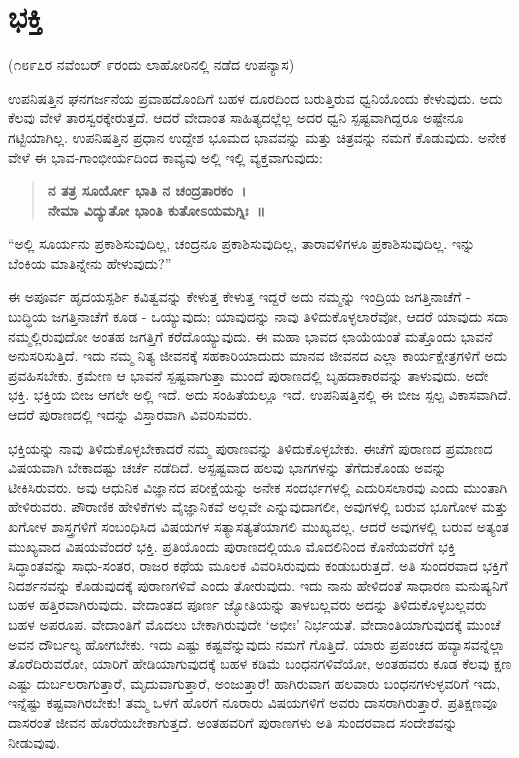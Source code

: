 
\chapter{ಭಕ್ತಿ}

\begin{center}
(೧೮೯೭ರ ನವೆಂಬರ್​ ೯ರಂದು ಲಾಹೋರಿನಲ್ಲಿ ನಡೆದ ಉಪನ್ಯಾಸ)
\end{center}

ಉಪನಿಷತ್ತಿನ ಘನಗರ್ಜನೆಯ ಪ್ರವಾಹದೊಂದಿಗೆ ಬಹಳ ದೂರದಿಂದ ಬರುತ್ತಿರುವ ಧ್ವನಿಯೊಂದು ಕೇಳುವುದು. ಅದು ಕೆಲವು ವೇಳೆ ತಾರಸ್ವರಕ್ಕೇರುತ್ತದೆ. ಆದರೆ ವೇದಾಂತ ಸಾಹಿತ್ಯದಲ್ಲೆಲ್ಲ ಅದರ ಧ್ವನಿ ಸ್ಪಷ್ಟವಾಗಿದ್ದರೂ ಅಷ್ಟೇನೂ ಗಟ್ಟಿಯಾಗಿಲ್ಲ. ಉಪನಿಷತ್ತಿನ ಪ್ರಧಾನ ಉದ್ದೇಶ ಭೂಮದ ಭಾವವನ್ನು ಮತ್ತು ಚಿತ್ರವನ್ನು ನಮಗೆ ಕೊಡುವುದು. ಅನೇಕ ವೇಳೆ ಈ ಭಾವ-ಗಾಂಭೀರ್ಯದಿಂದ ಕಾವ್ಯವು ಅಲ್ಲಿ ಇಲ್ಲಿ ವ್ಯಕ್ತವಾಗುವುದು:

\begin{verse}
\textbf{ನ ತತ್ರ ಸೂರ್ಯೋ ಭಾತಿ ನ ಚಂದ್ರತಾರಕಂ~।}\\\textbf{ನೇಮಾ ವಿದ್ಯುತೋ ಭಾಂತಿ ಕುತೋಽಯಮಗ್ನಿಃ~॥}
\end{verse}

“ಅಲ್ಲಿ ಸೂರ್ಯನು ಪ್ರಕಾಶಿಸುವುದಿಲ್ಲ, ಚಂದ್ರನೂ ಪ್ರಕಾಶಿಸುವುದಿಲ್ಲ, ತಾರಾವಳಿಗಳೂ ಪ್ರಕಾಶಿಸುವುದಿಲ್ಲ. ಇನ್ನು ಬೆಂಕಿಯ ಮಾತಿನ್ನೇನು ಹೇಳುವುದು?”

ಈ ಅಪೂರ್ವ ಹೃದಯಸ್ಪರ್ಶಿ ಕವಿತ್ವವನ್ನು ಕೇಳುತ್ತ ಕೇಳುತ್ತ ಇದ್ದರೆ ಅದು ನಮ್ಮನ್ನು ಇಂದ್ರಿಯ ಜಗತ್ತಿನಾಚೆಗೆ - ಬುದ್ಧಿಯ ಜಗತ್ತಿನಾಚೆಗೆ ಕೂಡ - ಒಯ್ಯುವುದು; ಯಾವುದನ್ನು ನಾವು ತಿಳಿದುಕೊಳ್ಳಲಾರೆವೋ, ಆದರೆ ಯಾವುದು ಸದಾ ನಮ್ಮಲ್ಲಿರುವುದೋ ಅಂತಹ ಜಗತ್ತಿಗೆ ಕರೆದೊಯ್ಯುವುದು. ಈ ಮಹಾ ಭಾವದ ಛಾಯೆಯಂತೆ ಮತ್ತೊಂದು ಭಾವನೆ ಅನುಸರಿಸುತ್ತಿದೆ. ಇದು ನಮ್ಮ ನಿತ್ಯ ಜೀವನಕ್ಕೆ ಸಹಕಾರಿಯಾದುದು ಮಾನವ ಜೀವನದ ಎಲ್ಲಾ ಕಾರ್ಯಕ್ಷೇತ್ರಗಳಿಗೆ ಅದು ಪ್ರವಹಿಸಬೇಕು. ಕ್ರಮೇಣ ಆ ಭಾವನೆ ಸ್ಪಷ್ಟವಾಗುತ್ತಾ ಮುಂದೆ ಪುರಾಣದಲ್ಲಿ ಬೃಹದಾಕಾರವನ್ನು ತಾಳುವುದು. ಅದೇ ಭಕ್ತಿ. ಭಕ್ತಿಯ ಬೀಜ ಆಗಲೇ ಅಲ್ಲಿ ಇದೆ. ಅದು ಸಂಹಿತೆಯಲ್ಲೂ ಇದೆ. ಉಪನಿಷತ್ತಿನಲ್ಲಿ ಈ ಬೀಜ ಸ್ಪಲ್ಪ ವಿಕಾಸವಾಗಿದೆ. ಆದರೆ ಪುರಾಣದಲ್ಲಿ ಇದನ್ನು ವಿಸ್ತಾರವಾಗಿ ವಿವರಿಸುವರು.

ಭಕ್ತಿಯನ್ನು ನಾವು ತಿಳಿದುಕೊಳ್ಳಬೇಕಾದರೆ ನಮ್ಮ ಪುರಾಣವನ್ನು ತಿಳಿದುಕೊಳ್ಳಬೇಕು. ಈಚೆಗೆ ಪುರಾಣದ ಪ್ರಮಾಣದ ವಿಷಯವಾಗಿ ಬೇಕಾದಷ್ಟು ಚರ್ಚೆ ನಡೆದಿದೆ. ಅಸ್ಪಷ್ಟವಾದ ಹಲವು ಭಾಗಗಳನ್ನು ತೆಗೆದುಕೊಂಡು ಅವನ್ನು ಟೀಕಿಸಿರುವರು. ಅವು ಆಧುನಿಕ ವಿಜ್ಞಾನದ ಪರೀಕ್ಷೆಯನ್ನು ಅನೇಕ ಸಂದರ್ಭಗಳಲ್ಲಿ ಎದುರಿಸಲಾರವು ಎಂದು ಮುಂತಾಗಿ ಹೇಳಿರುವರು. ಪೌರಾಣಿಕ ಹೇಳಿಕೆಗಳು ವೈಜ್ಞಾನಿಕವೆ ಅಲ್ಲವೇ ಎನ್ನುವುದಾಗಲೀ, ಅವುಗಳಲ್ಲಿ ಬರುವ ಭೂಗೋಳ ಮತ್ತು ಖಗೋಳ ಶಾಸ್ತ್ರಗಳಿಗೆ ಸಂಬಂಧಿಸಿದ ವಿಷಯಗಳ ಸತ್ಯಾಸತ್ಯತೆಯಾಗಲಿ ಮುಖ್ಯವಲ್ಲ. ಆದರೆ ಅವುಗಳಲ್ಲಿ ಬರುವ ಅತ್ಯಂತ ಮುಖ್ಯವಾದ ವಿಷಯವೆಂದರೆ ಭಕ್ತಿ. ಪ್ರತಿಯೊಂದು ಪುರಾಣದಲ್ಲಿಯೂ ಮೊದಲಿನಿಂದ ಕೊನೆಯವರೆಗೆ ಭಕ್ತಿ ಸಿದ್ಧಾಂತವನ್ನು ಸಾಧು-ಸಂತರ, ರಾಜರ ಕಥೆಯ ಮೂಲಕ ವಿವರಿಸಿರುವುದು ಕಂಡುಬರುತ್ತದೆ. ಅತಿ ಸುಂದರವಾದ ಭಕ್ತಿಗೆ ನಿದರ್ಶನವನ್ನು ಕೊಡುವುದಕ್ಕೆ ಪುರಾಣಗಳಿವೆ ಎಂದು ತೋರುವುದು. ಇದು ನಾನು ಹೇಳಿದಂತೆ ಸಾಧಾರಣ ಮನುಷ್ಯನಿಗೆ ಬಹಳ ಹತ್ತಿರವಾಗಿರುವುದು. ವೇದಾಂತದ ಪೂರ್ಣ ಜ್ಯೋತಿಯನ್ನು ತಾಳಬಲ್ಲವರು ಅದನ್ನು ತಿಳಿದುಕೊಳ್ಳಬಲ್ಲವರು ಬಹಳ ಅಪರೂಪ. ವೇದಾಂತಿಗೆ ಮೊದಲು ಬೇಕಾಗಿರುವುದೇ ‘ಅಭೀಃ’ ನಿರ್ಭಯತೆ. ವೇದಾಂತಿಯಾಗುವುದಕ್ಕೆ ಮುಂಚೆ ಅವನ ದೌರ್ಬಲ್ಯ ಹೋಗಬೇಕು. ಇದು ಎಷ್ಟು ಕಷ್ಟವೆನ್ನುವುದು ನಮಗೆ ಗೊತ್ತಿದೆ. ಯಾರು ಪ್ರಪಂಚದ ಹವ್ಯಾಸವನ್ನೆಲ್ಲಾ ತೊರೆದಿರುವರೋ, ಯಾರಿಗೆ ಹೇಡಿಯಾಗುವುದಕ್ಕೆ ಬಹಳ ಕಡಿಮೆ ಬಂಧನಗಳಿವೆಯೋ, ಅಂತಹವರು ಕೂಡ ಕೆಲವು ಕ್ಷಣ ಎಷ್ಟು ದುರ್ಬಲರಾಗುತ್ತಾರೆ, ಮೃದುವಾಗುತ್ತಾರೆ, ಅಂಜುತ್ತಾರೆ! ಹಾಗಿರುವಾಗ ಹಲವಾರು ಬಂಧನಗಳುಳ್ಳವರಿಗೆ ಇದು, ಇನ್ನೆಷ್ಟು ಕಷ್ಟವಾಗಿರಬೇಕು! ತಮ್ಮ ಒಳಗೆ ಹೊರಗೆ ನೂರಾರು ವಿಷಯಗಳಿಗೆ ಅವರು ದಾಸರಾಗಿರುತ್ತಾರೆ. ಪ್ರತಿಕ್ಷಣವೂ ದಾಸರಂತೆ ಜೀವನ ಹೊರೆಯಬೇಕಾಗುತ್ತದೆ. ಅಂತಹವರಿಗೆ ಪುರಾಣಗಳು ಅತಿ ಸುಂದರವಾದ ಸಂದೇಶವನ್ನು ನೀಡುವುವು.

